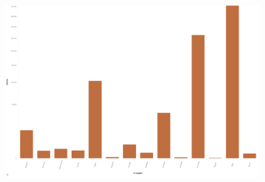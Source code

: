\begin{figure}[h]
    \centering
    \includegraphics[width=\textwidth]{figures/tpot-overview-attacks.png}
    \caption[]{}
    \label{fig:overview-attacks}
\end{figure}

